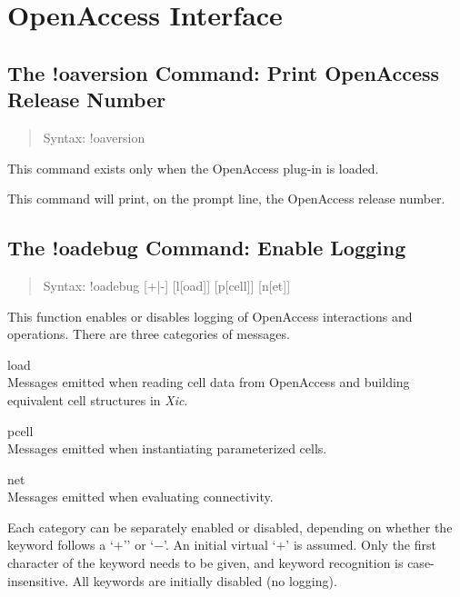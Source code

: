 \section{OpenAccess Interface}

\subsection{The {\cb !oaversion} Command: Print OpenAccess Release Number}
\begin{quote}
Syntax: {\vt !oaversion}
\end{quote}
This command exists only when the OpenAccess plug-in is loaded.

This command will print, on the prompt line, the OpenAccess release
number.

\subsection{The {\cb !oadebug} Command: Enable Logging}
\begin{quote}
Syntax: {\vt !oadebug} [{\vt +}{\vt |}{\vt -}] [{\vt l}[{\vt oad}]]
[{\vt p}[{\vt cell}]] [{\vt n}[{\vt et}]]
\end{quote}
This function enables or disables logging of OpenAccess interactions
and operations.  There are three categories of messages.

\begin{description}
\item{\vt load}\\
Messages emitted when reading cell data from OpenAccess and building
equivalent cell structures in {\it Xic}.

\item{\vt pcell}\\
Messages emitted when instantiating parameterized cells.

\item{\vt net}\\
Messages emitted when evaluating connectivity.
\end{description}

Each category can be separately enabled or disabled, depending on
whether the keyword follows a `$+$'' or `$-$'.  An initial virtual
`$+$' is assumed.  Only the first character of the keyword needs to be
given, and keyword recognition is case-insensitive.  All keywords are
initially disabled (no logging).

